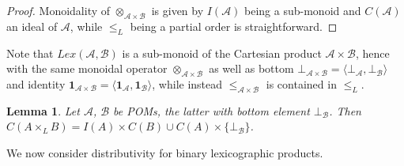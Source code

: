 \documentclass[a4paper]{elsarticle}
\newtheorem{lemma}{Lemma}
\newcommand{\monop}{\otimes}
\newcommand{\1}{\mathbf{1}}
\begin{document}
\begin{proof}
	Monoidality of $\monop_{\mathcal{A} \times \mathcal{B}}$ is given by  $I(\mathcal{A})$ being a sub-monoid
	and $C(\mathcal{A})$ an ideal of $\mathcal{A}$, while $\leq_L$ being a partial order is straightforward.
\end{proof}

Note that $Lex(\mathcal{A},\mathcal{B})$ is a sub-monoid of the Cartesian product $\mathcal{A} \times \mathcal{B}$,
hence with the same monoidal operator $\monop_{\mathcal{A} \times \mathcal{B}}$ as well as 
bottom $\bot_{\mathcal{A} \times \mathcal{B}} = \langle \bot_\mathcal{A}, \bot_\mathcal{B} \rangle$ and
identity $\1_{\mathcal{A} \times \mathcal{B}} = \langle \1_\mathcal{A}, \1_\mathcal{B} \rangle$,
while instead $\leq_{\mathcal{A} \times \mathcal{B}}$ is contained in $\leq_L$.
%

\begin{lemma}
Let $\mathcal{A}$, $\mathcal{B}$ be POMs, the latter with bottom element $\bot_\mathcal{B}$.
%
Then $C(A \times_L B) = I(A) \times C(B) \cup C(A) \times \{\bot_\mathcal{B}\}$.
\end{lemma}

We now consider distributivity for binary lexicographic products.
\end{document}
